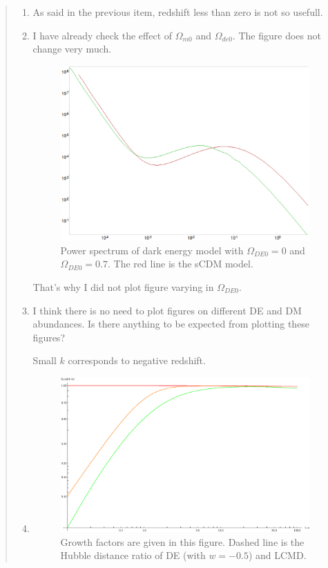 \documentclass{article}
\begin{document}
\begin{quotation}
{\begin{enumerate}
\item
As said in the previous item, redshift less than zero is not so usefull.

\item
I have already check the effect of $\Omega_{m0}$ and $\Omega_{de0}$. The figure does not change very much.

\begin{figure}[!htpb]
\centering
\includegraphics[width=350pt]{PowerSpectrumDEsCDMCMBEASY.eps}
\caption{\color{blue}Power spectrum of dark energy model with $\Omega_{DE0}=0$ and $\Omega_{DE0}=0.7$. The red line is the sCDM model.}
\end{figure}

That's why I did not plot figure varying in $\Omega_{DE0}$.

\item
I think there is no need to plot figures on different DE and DM abundances. Is there anything to be expected from plotting these figures?

Small $k$ corresponds to negative redshift.

\item


\begin{figure}[!htpb]
\centering
\includegraphics[width=350pt]{DE_Supp_GrowthFactors.eps}
\caption{\color{blue}Growth factors are given in this figure. Dashed line is the Hubble distance ratio of DE (with $w=-0.5$) and LCMD.}\label{fig:DE_Supp_GrowthFactors}
\end{figure}


\end{enumerate}}
\end{quotation}
\end{document}
